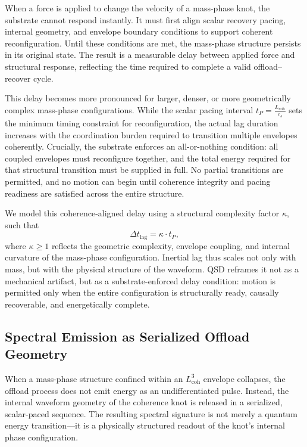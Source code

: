 \documentclass[entropy,article,submit,pdftex,moreauthors]{Definitions/mdpi}
\begin{document}
When a force is applied to change the velocity of a mass-phase knot, the substrate cannot respond instantly. It must first align scalar recovery pacing, internal geometry, and envelope boundary conditions to support coherent reconfiguration. Until these conditions are met, the mass-phase structure persists in its original state. The result is a measurable delay between applied force and structural response, reflecting the time required to complete a valid offload–recover cycle.

This delay becomes more pronounced for larger, denser, or more geometrically complex mass-phase configurations. While the scalar pacing interval \( t_P = \frac{L_{\text{coh}}}{c_s} \) sets the minimum timing constraint for reconfiguration, the actual lag duration increases with the coordination burden required to transition multiple envelopes coherently. Crucially, the substrate enforces an all-or-nothing condition: all coupled envelopes must reconfigure together, and the total energy required for that structural transition must be supplied in full. No partial transitions are permitted, and no motion can begin until coherence integrity and pacing readiness are satisfied across the entire structure.

We model this coherence-aligned delay using a structural complexity factor \( \kappa \), such that
\[
\Delta t_{\text{lag}} = \kappa \cdot t_P,
\]
where \( \kappa \geq 1 \) reflects the geometric complexity, envelope coupling, and internal curvature of the mass-phase configuration. Inertial lag thus scales not only with mass, but with the physical structure of the waveform. QSD reframes it not as a mechanical artifact, but as a substrate-enforced delay condition: motion is permitted only when the entire configuration is structurally ready, causally recoverable, and energetically complete.

\subsection{Spectral Emission as Serialized Offload Geometry}

When a mass-phase structure confined within an \texorpdfstring{\( L_{\text{coh}}^3 \)}{Lcoh\^{}3} envelope collapses, the offload process does not emit energy as an undifferentiated pulse. Instead, the internal waveform geometry of the coherence knot is released in a serialized, scalar-paced sequence. The resulting spectral signature is not merely a quantum energy transition—it is a physically structured readout of the knot’s internal phase configuration.
\end{document}
